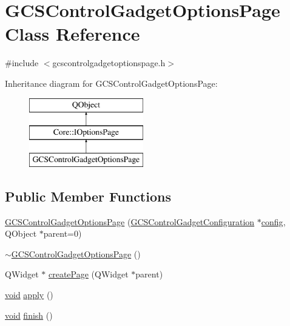 \hypertarget{class_g_c_s_control_gadget_options_page}{\section{G\-C\-S\-Control\-Gadget\-Options\-Page Class Reference}
\label{class_g_c_s_control_gadget_options_page}
}


{\ttfamily \#include $<$gcscontrolgadgetoptionspage.\-h$>$}

Inheritance diagram for G\-C\-S\-Control\-Gadget\-Options\-Page\-:\begin{figure}[H]
\begin{center}
\leavevmode
\includegraphics[height=3.000000cm]{class_g_c_s_control_gadget_options_page}
\end{center}
\end{figure}
\subsection*{Public Member Functions}
\begin{DoxyCompactItemize}
\item 
\hyperlink{group___g_c_s_control_gadget_plugin_ga133610c0fce1048e9c145e0e6f4ff7b8}{G\-C\-S\-Control\-Gadget\-Options\-Page} (\hyperlink{class_g_c_s_control_gadget_configuration}{G\-C\-S\-Control\-Gadget\-Configuration} $\ast$\hyperlink{deflate_8c_a4473b5227787415097004fd39f55185e}{config}, Q\-Object $\ast$parent=0)
\item 
\hyperlink{group___g_c_s_control_gadget_plugin_ga1dbf3c631b0254ac184bfa202ea00b17}{$\sim$\-G\-C\-S\-Control\-Gadget\-Options\-Page} ()
\item 
Q\-Widget $\ast$ \hyperlink{group___g_c_s_control_gadget_plugin_ga581ba836a94117d6d887ee555a4917c6}{create\-Page} (Q\-Widget $\ast$parent)
\item 
\hyperlink{group___u_a_v_objects_plugin_ga444cf2ff3f0ecbe028adce838d373f5c}{void} \hyperlink{group___g_c_s_control_gadget_plugin_gad8fa5da9631986d02639e5b520028c91}{apply} ()
\item 
\hyperlink{group___u_a_v_objects_plugin_ga444cf2ff3f0ecbe028adce838d373f5c}{void} \hyperlink{group___g_c_s_control_gadget_plugin_ga99dea02a466b40903d82ed298e62a038}{finish} ()
\end{DoxyCompactItemize}
